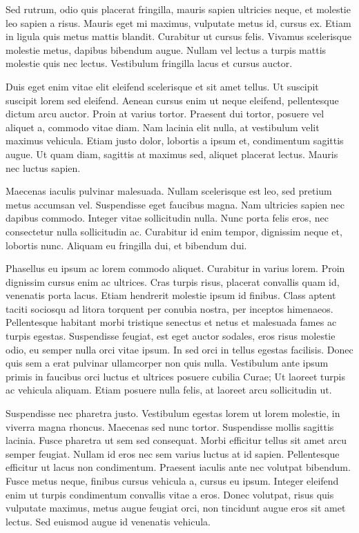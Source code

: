 Sed rutrum, odio quis placerat fringilla, mauris sapien ultricies neque, et molestie leo sapien a risus. Mauris eget mi maximus, vulputate metus id, cursus ex. Etiam in ligula quis metus mattis blandit. Curabitur ut cursus felis. Vivamus scelerisque molestie metus, dapibus bibendum augue. Nullam vel lectus a turpis mattis molestie quis nec lectus. Vestibulum fringilla lacus et cursus auctor.

Duis eget enim vitae elit eleifend scelerisque et sit amet tellus. Ut suscipit suscipit lorem sed eleifend. Aenean cursus enim ut neque eleifend, pellentesque dictum arcu auctor. Proin at varius tortor. Praesent dui tortor, posuere vel aliquet a, commodo vitae diam. Nam lacinia elit nulla, at vestibulum velit maximus vehicula. Etiam justo dolor, lobortis a ipsum et, condimentum sagittis augue. Ut quam diam, sagittis at maximus sed, aliquet placerat lectus. Mauris nec luctus sapien.

Maecenas iaculis pulvinar malesuada. Nullam scelerisque est leo, sed pretium metus accumsan vel. Suspendisse eget faucibus magna. Nam ultricies sapien nec dapibus commodo. Integer vitae sollicitudin nulla. Nunc porta felis eros, nec consectetur nulla sollicitudin ac. Curabitur id enim tempor, dignissim neque et, lobortis nunc. Aliquam eu fringilla dui, et bibendum dui.

Phasellus eu ipsum ac lorem commodo aliquet. Curabitur in varius lorem. Proin dignissim cursus enim ac ultrices. Cras turpis risus, placerat convallis quam id, venenatis porta lacus. Etiam hendrerit molestie ipsum id finibus. Class aptent taciti sociosqu ad litora torquent per conubia nostra, per inceptos himenaeos. Pellentesque habitant morbi tristique senectus et netus et malesuada fames ac turpis egestas. Suspendisse feugiat, est eget auctor sodales, eros risus molestie odio, eu semper nulla orci vitae ipsum. In sed orci in tellus egestas facilisis. Donec quis sem a erat pulvinar ullamcorper non quis nulla. Vestibulum ante ipsum primis in faucibus orci luctus et ultrices posuere cubilia Curae; Ut laoreet turpis ac vehicula aliquam. Etiam posuere nulla felis, at laoreet arcu sollicitudin ut.

Suspendisse nec pharetra justo. Vestibulum egestas lorem ut lorem molestie, in viverra magna rhoncus. Maecenas sed nunc tortor. Suspendisse mollis sagittis lacinia. Fusce pharetra ut sem sed consequat. Morbi efficitur tellus sit amet arcu semper feugiat. Nullam id eros nec sem varius luctus at id sapien. Pellentesque efficitur ut lacus non condimentum. Praesent iaculis ante nec volutpat bibendum. Fusce metus neque, finibus cursus vehicula a, cursus eu ipsum. Integer eleifend enim ut turpis condimentum convallis vitae a eros. Donec volutpat, risus quis vulputate maximus, metus augue feugiat orci, non tincidunt augue eros sit amet lectus. Sed euismod augue id venenatis vehicula.

